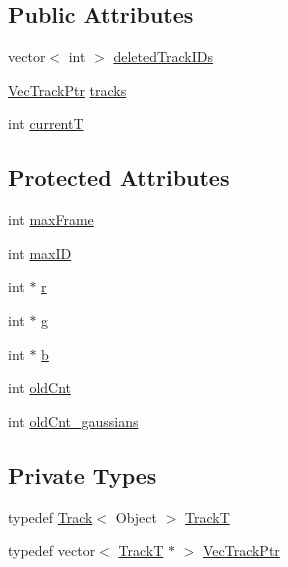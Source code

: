 \subsection*{\-Public \-Attributes}
\begin{DoxyCompactItemize}
\item 
vector$<$ int $>$ \hyperlink{class_track_container_a17fafd224f076ad6d2a97433b6afa91d}{deleted\-Track\-I\-Ds}
\item 
\hyperlink{class_track_container_a44996c9863d05fe83d9e231f3fd8c1a5}{\-Vec\-Track\-Ptr} \hyperlink{class_track_container_af2e81ac6619a2a6cdf631561c8287dbd}{tracks}
\item 
int \hyperlink{class_track_container_a5bb638a32d63aab28ca962a86b481262}{current\-T}
\end{DoxyCompactItemize}
\subsection*{\-Protected \-Attributes}
\begin{DoxyCompactItemize}
\item 
int \hyperlink{class_track_container_a095e227d79bf2b5c25412aa983db0f60}{max\-Frame}
\item 
int \hyperlink{class_track_container_a55b104a8da7c9c6bf1fdaa3057c344d2}{max\-I\-D}
\item 
int $\ast$ \hyperlink{class_track_container_af38637116045868dc48feeddb2310f46}{r}
\item 
int $\ast$ \hyperlink{class_track_container_ab08bd9bc429d2bf3bf8a0a81ddb27752}{g}
\item 
int $\ast$ \hyperlink{class_track_container_a090d3d6e83acad80cad082cd718a4ab3}{b}
\item 
int \hyperlink{class_track_container_a6c01352d78062d345f86ba6fc434717a}{old\-Cnt}
\item 
int \hyperlink{class_track_container_a797563af78394ee7a5f65db38d2ad987}{old\-Cnt\-\_\-gaussians}
\end{DoxyCompactItemize}
\subsection*{\-Private \-Types}
\begin{DoxyCompactItemize}
\item 
typedef \hyperlink{class_track}{\-Track}$<$ \-Object $>$ \hyperlink{class_track_container_a444451c20696d1cd624f85404c9b5219}{\-Track\-T}
\item 
typedef vector$<$ \hyperlink{class_track_container_a444451c20696d1cd624f85404c9b5219}{\-Track\-T} $\ast$ $>$ \hyperlink{class_track_container_a44996c9863d05fe83d9e231f3fd8c1a5}{\-Vec\-Track\-Ptr}
\end{DoxyCompactItemize}
